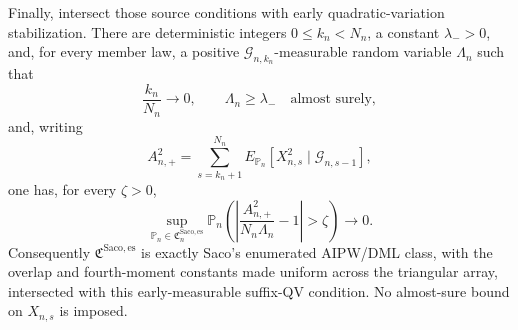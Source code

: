 Finally, intersect those source conditions with early quadratic-variation stabilization.  There are deterministic integers \(0\le k_n<N_n\), a constant \(\lambda_->0\), and, for every member law, a positive \(\mathcal G_{n,k_n}\)-measurable random variable \(\Lambda_n\) such that
\[
\frac{k_n}{N_n}\longrightarrow0,\qquad \Lambda_n\ge\lambda_-\quad\text{almost surely},
\]
and, writing
\[
A_{n,+}^2=\sum_{s=k_n+1}^{N_n}
E_{\mathbb P_n}[X_{n,s}^2\mid\mathcal G_{n,s-1}],
\]
one has, for every \(\zeta>0\),
\[
\sup_{\mathbb P_n\in\mathfrak C_n^{\mathrm{Saco,es}}}
\mathbb P_n\left(\left|\frac{A_{n,+}^2}{N_n\Lambda_n}-1\right|>\zeta\right)\longrightarrow0.
\]
Consequently \(\mathfrak C^{\mathrm{Saco,es}}\) is exactly Saco's enumerated AIPW/DML class, with the overlap and fourth-moment constants made uniform across the triangular array, intersected with this early-measurable suffix-QV condition.  No almost-sure bound on \(X_{n,s}\) is imposed.